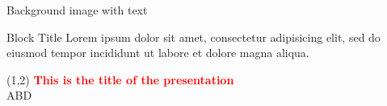 \documentclass{beamer}
\begin{document}

{ 
\begin{frame}{Background image with text}
\vspace{2em}
\begin{block}{Block Title}
Lorem ipsum dolor sit amet, consectetur adipisicing elit, 
sed do eiusmod tempor incididunt ut labore et 
dolore magna aliqua.
\end{block}
\end{frame}}


{ 
\begin{frame}
 \begin{textblock}{10.0}(1,2)
  \textcolor{red}{\textbf{This is the title of the presentation}}\\
  ABD
  
 \end{textblock}
\end{frame}}

\end{document}
